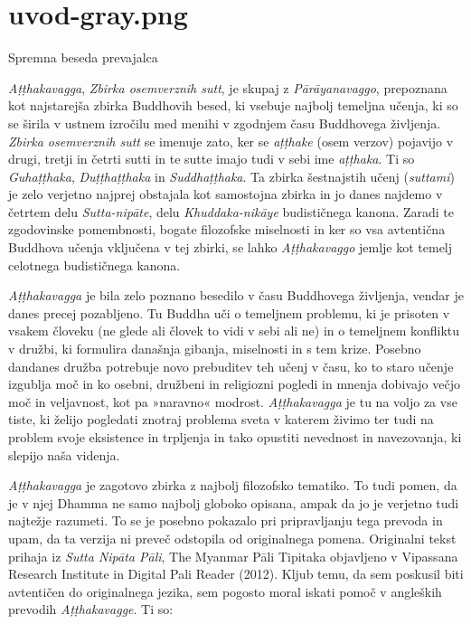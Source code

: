 
\chapter[Uvod]{uvod-gray.png}

Spremna beseda prevajalca

\emph{Aṭṭhakavagga}, \emph{Zbirka osemverznih sutt}, je skupaj z
\emph{Pārāyanavaggo}, prepoznana kot najstarejša zbirka Buddhovih besed,
ki vsebuje najbolj temeljna učenja, ki so se širila v ustnem izročilu
med menihi v zgodnjem času Buddhovega življenja. \emph{Zbirka
osemverznih sutt} se imenuje zato, ker se \emph{aṭṭhake} (osem verzov)
pojavijo v drugi, tretji in četrti sutti in te sutte imajo tudi v sebi
ime \emph{aṭṭhaka}. Ti so \emph{Guhaṭṭhaka}, \emph{Duṭṭhaṭṭhaka} in
\emph{Suddhaṭṭhaka}. Ta zbirka šestnajstih učenj (\emph{suttami}) je
zelo verjetno najprej obstajala kot samostojna zbirka in jo danes
najdemo v četrtem delu \emph{Sutta-nipāte}, delu \emph{Khuddaka-nikāye}
budističnega kanona. Zaradi te zgodovinske pomembnosti, bogate
filozofske miselnosti in ker so vsa avtentična Buddhova učenja vključena
v tej zbirki, se lahko \emph{Aṭṭhakavaggo} jemlje kot temelj celotnega
budističnega kanona.

\emph{Aṭṭhakavagga} je bila zelo poznano besedilo v času Buddhovega
življenja, vendar je danes precej pozabljeno. Tu Buddha uči o temeljnem
problemu, ki je prisoten v vsakem človeku (ne glede ali človek to vidi v
sebi ali ne) in o temeljnem konfliktu v družbi, ki formulira današnja
gibanja, miselnosti in s tem krize. Posebno dandanes družba potrebuje
novo prebuditev teh učenj v času, ko to staro učenje izgublja moč in ko
osebni, družbeni in religiozni pogledi in mnenja dobivajo večjo moč in
veljavnost, kot pa »naravno« modrost. \emph{Aṭṭhakavagga} je tu na voljo
za vse tiste, ki želijo pogledati znotraj problema sveta v katerem
živimo ter tudi na problem svoje eksistence in trpljenja in tako
opustiti nevednost in navezovanja, ki slepijo naša videnja.

\emph{Aṭṭhakavagga} je zagotovo zbirka z najbolj filozofsko tematiko.
To tudi pomen, da je v njej Dhamma ne samo najbolj globoko opisana,
ampak da jo je verjetno tudi najtežje razumeti. To se je posebno
pokazalo pri pripravljanju tega prevoda in upam, da ta verzija ni preveč
odstopila od originalnega pomena. Originalni tekst prihaja iz
\emph{Sutta Nipāta Pāli}, The Myanmar Pāli Tipitaka objavljeno v
Vipassana Research Institute in Digital Pali Reader (2012). Kljub temu,
da sem poskusil biti avtentičen do originalnega jezika, sem pogosto
moral iskati pomoč v angleških prevodih \emph{Aṭṭhakavagge}. Ti so:

